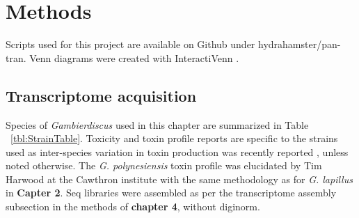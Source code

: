 \documentclass[12pt]{article}
\begin{document}
\section{Methods}
Scripts used for this project are available on Github under hydrahamster/pan-tran. 
Venn diagrams were created with InteractiVenn \cite{heberle2015venn}. 
\subsection{Transcriptome acquisition}
Species of \textit{Gambierdiscus} used in this chapter are summarized in Table ~\ref{tbl:StrainTable}. 
Toxicity and toxin profile reports are specific to the strains used as inter-species variation in toxin production was recently reported \cite{larsson2018toxicology,rhodes2017epiphytic}, unless noted otherwise. 
The \textit{G. polynesiensis} toxin profile was elucidated by Tim Harwood at the Cawthron institute with the same methodology as for \textit{G. lapillus} in \textbf{Capter 2}. 
Seq libraries were assembled as per the transcriptome assembly subsection in the methods of \textbf{chapter 4}, without diginorm. \\




\end{document}
